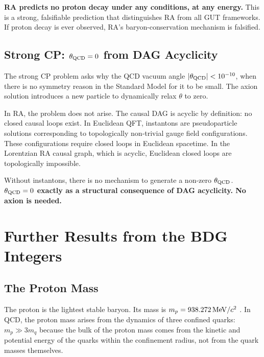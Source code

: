 \documentclass[12pt,a4paper]{article}
\begin{document}
\textbf{RA predicts no proton decay under any conditions, at any energy.}  This is a strong, falsifiable prediction that distinguishes RA from all GUT frameworks.  If proton decay is ever observed, RA's baryon-conservation mechanism is falsified.

\subsection{Strong CP: $\theta_{\rm QCD}=0$ from DAG Acyclicity}

The strong CP problem \cite{Peccei1977} asks why the QCD vacuum angle $|\theta_{\rm QCD}|<10^{-10}$, when there is no symmetry reason in the Standard Model for it to be small.  The axion solution \cite{Weinberg1978,Wilczek1978} introduces a new particle to dynamically relax $\theta$ to zero.

In RA, the problem does not arise.  The causal DAG is acyclic by definition: no closed causal loops exist.  In Euclidean QFT, instantons are pseudoparticle solutions corresponding to topologically non-trivial gauge field configurations.  These configurations require closed loops in Euclidean spacetime.  In the Lorentzian RA causal graph, which is acyclic, Euclidean closed loops are topologically impossible.

Without instantons, there is no mechanism to generate a non-zero $\theta_{\rm QCD}$.  \textbf{$\theta_{\rm QCD}=0$ exactly as a structural consequence of DAG acyclicity.  No axion is needed.}


\section{Further Results from the BDG Integers}\label{sec:further}

\subsection{The Proton Mass}

The proton is the lightest stable baryon.  Its mass is $m_p=938.272\,{\rm MeV}/c^2$ \cite{PDG2024}.  In QCD, the proton mass arises from the dynamics of three confined quarks: $m_p\gg3m_q$ because the bulk of the proton mass comes from the kinetic and potential energy of the quarks within the confinement radius, not from the quark masses themselves.
\end{document}
